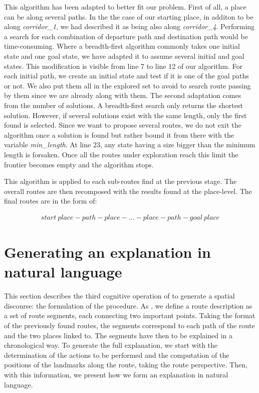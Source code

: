 This algorithm has been adapted to better fit our problem. First of all, a place can be along several paths. In the the case of our starting place, in additon to be along \textit{corridor\_1}, we had described it as being also along \textit{corridor\_4}. Performing a search for each combination of departure path and destination path would be time-consuming. Where a breadth-first algorithm commonly takes one initial state and one goal state, we have adapted it to assume several initial and goal states. This modification is visible from line 7 to line 12 of our algorithm. For each initial path, we create an initial state and test if it is one of the goal paths or not. We also put them all in the explored set to avoid to search route passing by them since we are already along with them. The second adaptation comes from the number of solutions. A breadth-first search only returns the shortest solution. However, if several solutions exist with the same length, only the first found is selected. Since we want to propose several routes, we do not exit the algorithm once a solution is found but rather bound it from there with the variable \textit{min\_length}. At line 23, any state having a size bigger than the minimum length is forsaken. Once all the routes under exploration reach this limit the frontier becomes empty and the algorithm stops.

This algorithm is applied to each sub-routes find at the previous stage. The overall routes are then recomposed with the results found at the place-level. The final routes are in the form of:

\begin{gather*}
start\ place - path - place - ... - place - path - goal\ place
\end{gather*}

\section{Generating an explanation in natural language}

This section describes the third cognitive operation of \cite{denis_1997_description} to generate a spatial discourse: the formulation of the procedure. As \cite{cassell_2007_trading}, we define a route description as a set of route segments, each connecting two important points. Taking the format of the previously found routes, the segments correspond to each path of the route and the two places linked to. The segments have then to be explained in a chronological way. To generate the full explanation, we start with the determination of the actions to be performed and the computation of the positions of the landmarks along the route, taking the route perspective. Then, with this information, we present how we form an explanation in natural language.

